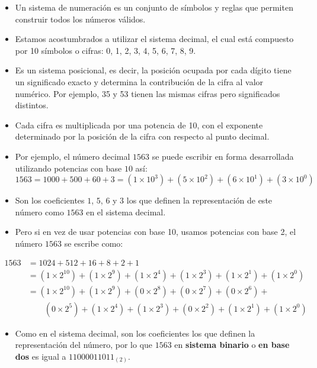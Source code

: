 \documentclass[openany]{book}
\providecommand{\tightlist}{%
  \setlength{\itemsep}{0pt}\setlength{\parskip}{0pt}}
\begin{document}
\begin{itemize}
\tightlist
\item
  Un sistema de numeración es un conjunto de símbolos y reglas que permiten construir todos los números válidos.
\item
  Estamos acostumbrados a utilizar el sistema decimal, el cual está compuesto por 10 símbolos o cifras: 0, 1, 2, 3, 4, 5, 6, 7, 8, 9.
\item
  Es un sistema posicional, es decir, la posición ocupada por cada dígito tiene un significado exacto y determina la contribución de la cifra al valor numérico. Por ejemplo, 35 y 53 tienen las mismas cifras pero significados distintos.
\item
  Cada cifra es multiplicada por una potencia de 10, con el exponente determinado por la posición de la cifra con respecto al punto decimal.
\item
  Por ejemplo, el número decimal \(1563\) se puede escribir en forma desarrollada utilizando potencias con base \(10\) así:
  \[1563 = 1000 + 500 + 60 + 3 = (1 \times 10^3) + (5 \times 10^2) + (6 \times 10^1) + (3 \times 10^0)\]
\item
  Son los coeficientes \(1\), \(5\), \(6\) y \(3\) los que definen la representación de este número como \(1563\) en el sistema decimal.
\item
  Pero si en vez de usar potencias con base 10, usamos potencias con base 2, el número \(1563\) se escribe como:
\end{itemize}

\[
\begin{aligned}
1563 & = 1024 + 512 + 16 + 8 + 2 + 1  \\
    &= (1 \times 2^{10}) + (1 \times 2^9) + (1 \times 2^4) + (1 \times 2^3) + (1 \times 2^1) + (1 \times 2^0) \\
    &= (1 \times 2^{10}) + (1 \times 2^9) + (0 \times 2^8) + (0 \times 2^7) + (0 \times 2^6) + \\
&\qquad (0 \times 2^5) + (1 \times 2^4) + (1 \times 2^3) + (0 \times 2^2) + (1 \times 2^1) + (1 \times 2^0)
\end{aligned} 
\]

\begin{itemize}
\tightlist
\item
  Como en el sistema decimal, son los coeficientes los que definen la representación del número, por lo que \(1563\) en \textbf{sistema binario} o \textbf{en base dos} es igual a \(11000011011_{(2)}\).
\end{itemize}
\end{document}
